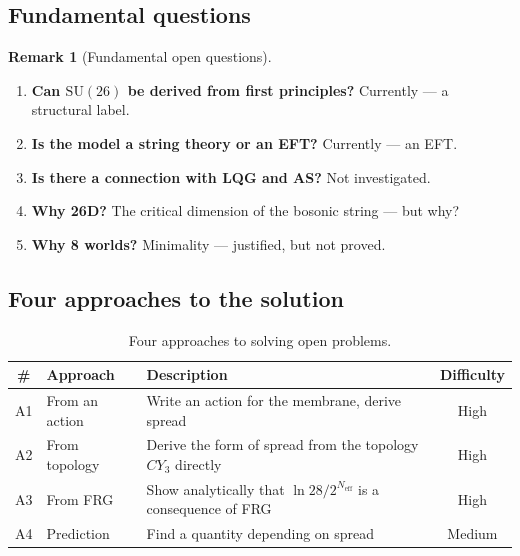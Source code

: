 \documentclass[11pt,a4paper]{article}
\newcommand{\SU}{\mathrm{SU}}
\newcommand{\CY}{CY_3}
\newcommand{\Neff}{N_{\text{eff}}}
\theoremstyle{definition}
\newtheorem{remark}[theorem]{Remark}
\begin{document}
\subsection{Fundamental questions}
\label{subsec:fundamental-questions}

\begin{remark}[Fundamental open questions]
\label{rem:fundamental-questions}
\begin{enumerate}
    \item \textbf{Can $\SU(26)$ be derived from first principles?} 
          Currently — a structural label.
    \item \textbf{Is the model a string theory or an EFT?} 
          Currently — an EFT.
    \item \textbf{Is there a connection with LQG and AS?} Not investigated.
    \item \textbf{Why 26D?} The critical dimension of the 
          bosonic string — but why?
    \item \textbf{Why 8 worlds?} Minimality — justified, 
          but not proved.
\end{enumerate}
\end{remark}

\subsection{Four approaches to the solution}
\label{subsec:four-approaches}

\begin{table}[htbp]
\centering
\caption{Four approaches to solving open problems.}
\label{tab:four-approaches}
\begin{tabular}{clp{5cm}c}
\toprule
\# & Approach & Description & Difficulty \\
\midrule
A1 & From an action & Write an action for the membrane, 
    derive spread & High \\[0.3em]
A2 & From topology & Derive the form of spread from the topology 
    $\CY$ directly & High \\[0.3em]
A3 & From FRG & Show analytically that $\ln 28/2^{\Neff}$ 
    is a consequence of FRG & High \\[0.3em]
A4 & Prediction & Find a quantity depending on spread & 
    Medium \\
\bottomrule
\end{tabular}
\end{table}
\end{document}
